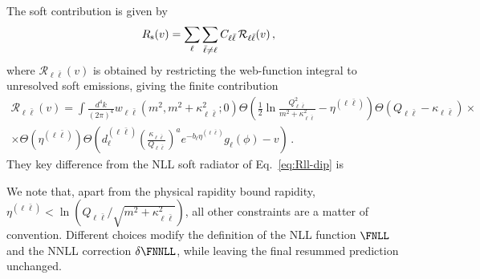   The soft contribution is given by
  \begin{equation}
  	R_{\rm s}(v)= \sum_\ell\sum_{\bar \ell\ne \ell} C_{\ell\bar \ell} \,\mathcal{R}_{\ell\bar\ell}(v)\,, 
  \end{equation}
where $\mathcal{R}_{\ell\bar\ell}(v)$ is obtained by restricting the
web-function integral to unresolved soft emissions, giving the finite
contribution
\begin{multline}
  \label{eq:Rll}
  \mathcal{R}_{\ell\bar\ell}(v) = \int\frac{d^4
    k}{(2\pi)^4}w_{\ell\bar\ell}(m^2,m^2+\kappa_{\ell\bar\ell}^2;0)
  \Theta\left(\frac 12\ln\frac{Q^2_{\ell\bar
        \ell}}{m^2+\kappa_{\ell\bar \ell}^2}-\eta^{(\ell\bar \ell)}
  \right) \Theta(Q_{\ell \bar\ell}-\kappa_{\ell\bar \ell}) \times \\
  \times \Theta(\eta^{(\ell\bar \ell)})
  \Theta\left(d^{(\ell\bar\ell)}_\ell\left(\frac{\kappa_{\ell\bar
          \ell}}{Q_{\ell\bar\ell}}\right)^{a}
    e^{-b_\ell\eta^{(\ell\bar \ell)}} g_\ell(\phi)-v\right)\,.
\end{multline}
They key difference from the NLL soft radiator of Eq.~\eqref{eq:Rll-dip}
is 

We note that, apart from the physical rapidity bound
rapidity, $\eta^{(\ell\bar \ell)}<\ln(Q_{\ell\bar\ell}/\sqrt{m^2+\kappa_{\ell\bar \ell}^2})$, 
  all other constraints are a matter of convention. Different choices modify the definition of the NLL function
$\FNLL$ and the NNLL correction $\delta\FNNLL$, while leaving the final resummed prediction
unchanged.

